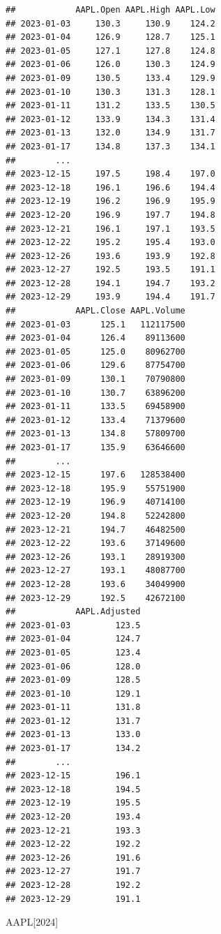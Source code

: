 \documentclass[]{ctexbook}
\newenvironment{Shaded}{\begin{snugshade}}{\end{snugshade}}
\newcommand{\NormalTok}[1]{#1}
\newcommand{\StringTok}[1]{\textcolor[rgb]{0.31,0.60,0.02}{#1}}
\begin{document}
\begin{verbatim}
##            AAPL.Open AAPL.High AAPL.Low
## 2023-01-03     130.3     130.9    124.2
## 2023-01-04     126.9     128.7    125.1
## 2023-01-05     127.1     127.8    124.8
## 2023-01-06     126.0     130.3    124.9
## 2023-01-09     130.5     133.4    129.9
## 2023-01-10     130.3     131.3    128.1
## 2023-01-11     131.2     133.5    130.5
## 2023-01-12     133.9     134.3    131.4
## 2023-01-13     132.0     134.9    131.7
## 2023-01-17     134.8     137.3    134.1
##        ...                             
## 2023-12-15     197.5     198.4    197.0
## 2023-12-18     196.1     196.6    194.4
## 2023-12-19     196.2     196.9    195.9
## 2023-12-20     196.9     197.7    194.8
## 2023-12-21     196.1     197.1    193.5
## 2023-12-22     195.2     195.4    193.0
## 2023-12-26     193.6     193.9    192.8
## 2023-12-27     192.5     193.5    191.1
## 2023-12-28     194.1     194.7    193.2
## 2023-12-29     193.9     194.4    191.7
##            AAPL.Close AAPL.Volume
## 2023-01-03      125.1   112117500
## 2023-01-04      126.4    89113600
## 2023-01-05      125.0    80962700
## 2023-01-06      129.6    87754700
## 2023-01-09      130.1    70790800
## 2023-01-10      130.7    63896200
## 2023-01-11      133.5    69458900
## 2023-01-12      133.4    71379600
## 2023-01-13      134.8    57809700
## 2023-01-17      135.9    63646600
##        ...                       
## 2023-12-15      197.6   128538400
## 2023-12-18      195.9    55751900
## 2023-12-19      196.9    40714100
## 2023-12-20      194.8    52242800
## 2023-12-21      194.7    46482500
## 2023-12-22      193.6    37149600
## 2023-12-26      193.1    28919300
## 2023-12-27      193.1    48087700
## 2023-12-28      193.6    34049900
## 2023-12-29      192.5    42672100
##            AAPL.Adjusted
## 2023-01-03         123.5
## 2023-01-04         124.7
## 2023-01-05         123.4
## 2023-01-06         128.0
## 2023-01-09         128.5
## 2023-01-10         129.1
## 2023-01-11         131.8
## 2023-01-12         131.7
## 2023-01-13         133.0
## 2023-01-17         134.2
##        ...              
## 2023-12-15         196.1
## 2023-12-18         194.5
## 2023-12-19         195.5
## 2023-12-20         193.4
## 2023-12-21         193.3
## 2023-12-22         192.2
## 2023-12-26         191.6
## 2023-12-27         191.7
## 2023-12-28         192.2
## 2023-12-29         191.1
\end{verbatim}

\begin{Shaded}
\begin{Highlighting}[]
\NormalTok{AAPL[}\StringTok{\textquotesingle{}2024\textquotesingle{}}\NormalTok{]}
\end{Highlighting}
\end{Shaded}
\end{document}
